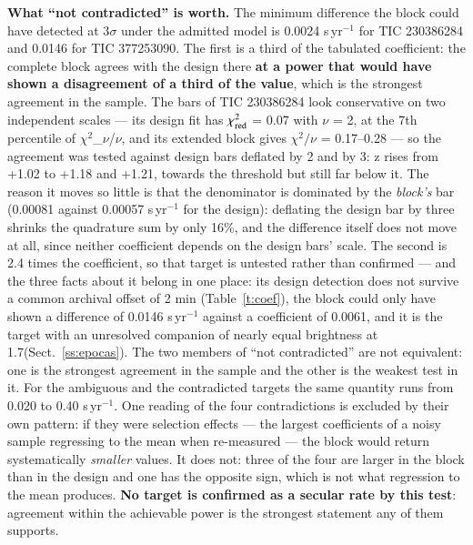 \documentclass{aa}
\begin{document}
\textbf{What ``not contradicted'' is worth.} The minimum difference the block could have detected at 3$\sigma$ under the admitted model is 0.0024 s\,yr$^{-1}$ for TIC 230386284 and 0.0146 for TIC 377253090. The first is a third of the tabulated coefficient: the complete block agrees with the design there \textbf{at a power that would have shown a disagreement of a third of the value}, which is the strongest agreement in the sample. The bars of TIC 230386284 look conservative on two independent scales --- its design fit has $\chi^2_{\rm red}$ = 0.07 with $\nu$ = 2, at the 7th percentile of $\chi^2$\_$\nu$/$\nu$, and its extended block gives $\chi^2/\nu$ = 0.17--0.28 --- so the agreement was tested against design bars deflated by 2 and by 3: z rises from +1.02 to +1.18 and +1.21, towards the threshold but still far below it. The reason it moves so little is that the denominator is dominated by the \textit{block's} bar (0.00081 against 0.00057 s\,yr$^{-1}$ for the design): deflating the design bar by three shrinks the quadrature sum by only 16\%, and the difference itself does not move at all, since neither coefficient depends on the design bars' scale. The second is 2.4 times the coefficient, so that target is untested rather than confirmed --- and the three facts about it belong in one place: its design detection does not survive a common archival offset of 2 min (Table~\ref{t:coef}), the block could only have shown a difference of 0.0146 s\,yr$^{-1}$ against a coefficient of 0.0061, and it is the target with an unresolved companion of nearly equal brightness at 1.7\arcsec (Sect.~\ref{ss:epocas}). The two members of ``not contradicted'' are not equivalent: one is the strongest agreement in the sample and the other is the weakest test in it. For the ambiguous and the contradicted targets the same quantity runs from 0.020 to 0.40 s\,yr$^{-1}$. One reading of the four contradictions is excluded by their own pattern: if they were selection effects --- the largest coefficients of a noisy sample regressing to the mean when re-measured --- the block would return systematically \textit{smaller} values. It does not: three of the four are larger in the block than in the design and one has the opposite sign, which is not what regression to the mean produces. \textbf{No target is confirmed as a secular rate by this test}: agreement within the achievable power is the strongest statement any of them supports.
\end{document}
